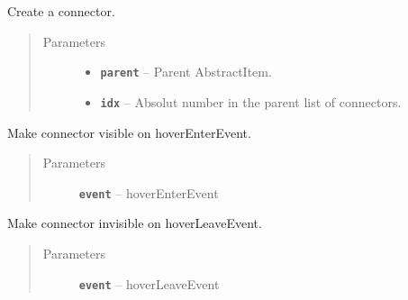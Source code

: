 \documentclass[a4paper,10pt,english]{sphinxmanual}
\begin{document}
\begin{fulllineitems}
\begin{fulllineitems}
\label{model_link:model.AbstractItem.Connector.__init__}
Create a connector.
\begin{quote}\begin{description}
\item[{Parameters}] \leavevmode\begin{itemize}
\item {} 
\textbf{\texttt{parent}} -- Parent AbstractItem.

\item {} 
\textbf{\texttt{idx}} -- Absolut number in the parent list of connectors.

\end{itemize}

\end{description}\end{quote}

\end{fulllineitems}


\begin{fulllineitems}
\label{model_link:model.AbstractItem.Connector.hoverEnterEvent}
Make connector visible on hoverEnterEvent.
\begin{quote}\begin{description}
\item[{Parameters}] \leavevmode
\textbf{\texttt{event}} -- hoverEnterEvent

\end{description}\end{quote}

\end{fulllineitems}


\begin{fulllineitems}
\label{model_link:model.AbstractItem.Connector.hoverLeaveEvent}
Make connector invisible on hoverLeaveEvent.
\begin{quote}\begin{description}
\item[{Parameters}] \leavevmode
\textbf{\texttt{event}} -- hoverLeaveEvent


\end{description}
\end{quote}
\end{fulllineitems}
\end{fulllineitems}
\end{document}

